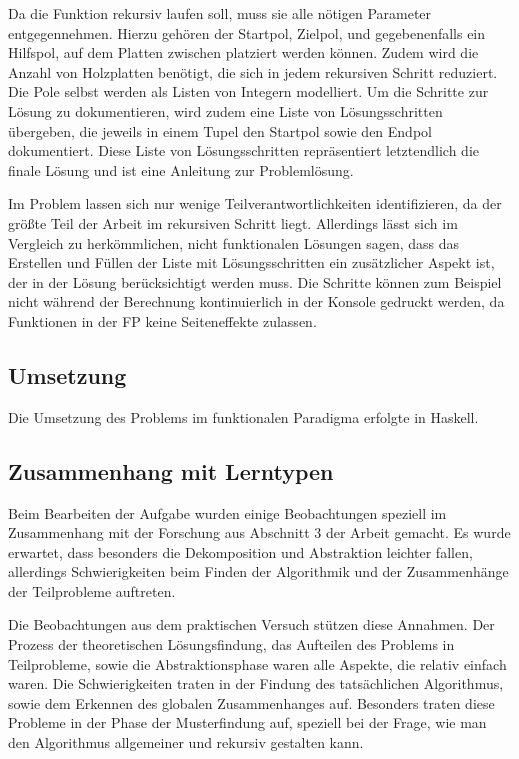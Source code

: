 Da die Funktion rekursiv laufen soll, muss sie alle nötigen Parameter entgegennehmen. Hierzu gehören der Startpol, Zielpol, und gegebenenfalls ein Hilfspol, auf dem Platten zwischen platziert werden können. Zudem wird die Anzahl von Holzplatten benötigt, die sich in jedem rekursiven Schritt reduziert. Die Pole selbst werden als Listen von Integern modelliert.
Um die Schritte zur Lösung zu dokumentieren, wird zudem eine Liste von Lösungsschritten übergeben, die jeweils in einem Tupel den Startpol sowie den Endpol dokumentiert. Diese Liste von Lösungsschritten repräsentiert letztendlich die finale Lösung und ist eine Anleitung zur Problemlösung.

Im Problem lassen sich nur wenige Teilverantwortlichkeiten identifizieren, da der größte Teil der Arbeit im rekursiven Schritt liegt. Allerdings lässt sich im Vergleich zu herkömmlichen, nicht funktionalen Lösungen sagen, dass das Erstellen und Füllen der Liste mit Lösungsschritten ein zusätzlicher Aspekt ist, der in der Lösung berücksichtigt werden muss. Die Schritte können zum Beispiel nicht während der Berechnung kontinuierlich in der Konsole gedruckt werden, da Funktionen in der FP keine Seiteneffekte zulassen.

\subsection{Umsetzung}

Die Umsetzung des Problems im funktionalen Paradigma erfolgte in Haskell. %

\subsection{Zusammenhang mit Lerntypen}
Beim Bearbeiten der Aufgabe wurden einige Beobachtungen speziell im Zusammenhang mit der Forschung aus Abschnitt 3 der Arbeit gemacht. Es wurde erwartet, dass besonders die Dekomposition und Abstraktion leichter fallen, allerdings Schwierigkeiten beim Finden der Algorithmik und der Zusammenhänge der Teilprobleme auftreten.

Die Beobachtungen aus dem praktischen Versuch stützen diese Annahmen. Der Prozess der theoretischen Lösungsfindung, das Aufteilen des Problems in Teilprobleme, sowie die Abstraktionsphase waren alle Aspekte, die relativ einfach waren. Die Schwierigkeiten traten in der Findung des tatsächlichen Algorithmus, sowie dem Erkennen des globalen Zusammenhanges auf. Besonders traten diese Probleme in der Phase der Musterfindung auf, speziell bei der Frage, wie man den Algorithmus allgemeiner und rekursiv gestalten kann.

